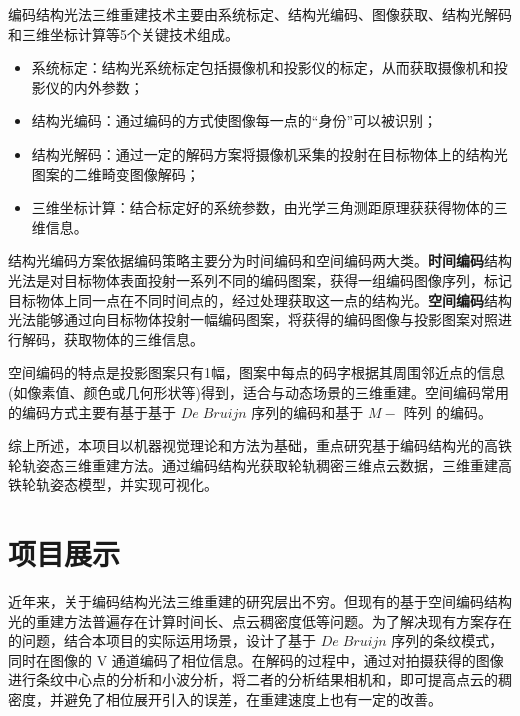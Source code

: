 \documentclass[article]{BJTU-thesis}
\begin{document}
     编码结构光法三维重建技术主要由系统标定、结构光编码、图像获取、结构光解码和三维坐标计算等5个关键技术组成。
 		\begin{itemize}
 			\item 系统标定：结构光系统标定包括摄像机和投影仪的标定，从而获取摄像机和投影仪的内外参数；
 			\item 结构光编码：通过编码的方式使图像每一点的“身份”可以被识别；
 			\item 结构光解码：通过一定的解码方案将摄像机采集的投射在目标物体上的结构光图案的二维畸变图像解码；
 			\item 三维坐标计算：结合标定好的系统参数，由光学三角测距原理获获得物体的三维信息。 									
		\end{itemize}
	
	结构光编码方案依据编码策略主要分为时间编码和空间编码两大类。\textbf{时间编码}结构光法是对目标物体表面投射一系列不同的编码图案，获得一组编码图像序列，标记目标物体上同一点在不同时间点的，经过处理获取这一点的结构光。\textbf{空间编码}结构光法能够通过向目标物体投射一幅编码图案，将获得的编码图像与投影图案对照进行解码，获取物体的三维信息。
	
     空间编码的特点是投影图案只有1幅，图案中每点的码字根据其周围邻近点的信息(如像素值、颜色或几何形状等)得到，适合与动态场景的三维重建。空间编码常用的编码方式主要有基于基于 $De \;Bruijn$ 序列的编码和基于 $M-$ 阵列 的编码。   
		
	综上所述，本项目以机器视觉理论和方法为基础，重点研究基于编码结构光的高铁轮轨姿态三维重建方法。通过编码结构光获取轮轨稠密三维点云数据，三维重建高铁轮轨姿态模型，并实现可视化。
	
     \section{项目展示}
    近年来，关于编码结构光法三维重建的研究层出不穷。但现有的基于空间编码结构光的重建方法普遍存在计算时间长、点云稠密度低等问题。为了解决现有方案存在的问题，结合本项目的实际运用场景，设计了基于 $De \;Bruijn$ 序列的条纹模式，同时在图像的 V 通道编码了相位信息。在解码的过程中，通过对拍摄获得的图像进行条纹中心点的分析和小波分析，将二者的分析结果相机和，即可提高点云的稠密度，并避免了相位展开引入的误差，在重建速度上也有一定的改善。 
     
\end{document}
